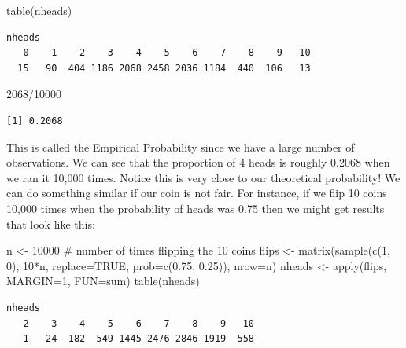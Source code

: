 \documentclass[
  letterpaper,
  DIV=11,
  numbers=noendperiod]{scrreprt}
\newenvironment{Shaded}{\begin{snugshade}}{\end{snugshade}}
\newcommand{\AttributeTok}[1]{\textcolor[rgb]{0.40,0.45,0.13}{#1}}
\newcommand{\CommentTok}[1]{\textcolor[rgb]{0.37,0.37,0.37}{#1}}
\newcommand{\ConstantTok}[1]{\textcolor[rgb]{0.56,0.35,0.01}{#1}}
\newcommand{\DecValTok}[1]{\textcolor[rgb]{0.68,0.00,0.00}{#1}}
\newcommand{\FloatTok}[1]{\textcolor[rgb]{0.68,0.00,0.00}{#1}}
\newcommand{\FunctionTok}[1]{\textcolor[rgb]{0.28,0.35,0.67}{#1}}
\newcommand{\NormalTok}[1]{\textcolor[rgb]{0.00,0.23,0.31}{#1}}
\newcommand{\OtherTok}[1]{\textcolor[rgb]{0.00,0.23,0.31}{#1}}
\newcommand{\SpecialCharTok}[1]{\textcolor[rgb]{0.37,0.37,0.37}{#1}}
\begin{document}
\begin{Shaded}
\begin{Highlighting}[]
\FunctionTok{table}\NormalTok{(nheads)}
\end{Highlighting}
\end{Shaded}

\begin{verbatim}
nheads
   0    1    2    3    4    5    6    7    8    9   10 
  15   90  404 1186 2068 2458 2036 1184  440  106   13 
\end{verbatim}

\begin{Shaded}
\begin{Highlighting}[]
\DecValTok{2068}\SpecialCharTok{/}\DecValTok{10000}
\end{Highlighting}
\end{Shaded}

\begin{verbatim}
[1] 0.2068
\end{verbatim}

This is called the Empirical Probability since we have a large number of
observations. We can see that the proportion of 4 heads is roughly
0.2068 when we ran it 10,000 times. Notice this is very close to our
theoretical probability! We can do something similar if our coin is not
fair. For instance, if we flip 10 coins 10,000 times when the
probability of heads was 0.75 then we might get results that look like
this:

\begin{Shaded}
\begin{Highlighting}[]
\NormalTok{n }\OtherTok{\textless{}{-}} \DecValTok{10000} \CommentTok{\# number of times flipping the 10 coins}
\NormalTok{flips }\OtherTok{\textless{}{-}} \FunctionTok{matrix}\NormalTok{(}\FunctionTok{sample}\NormalTok{(}\FunctionTok{c}\NormalTok{(}\DecValTok{1}\NormalTok{, }\DecValTok{0}\NormalTok{), }\DecValTok{10}\SpecialCharTok{*}\NormalTok{n, }\AttributeTok{replace=}\ConstantTok{TRUE}\NormalTok{, }\AttributeTok{prob=}\FunctionTok{c}\NormalTok{(}\FloatTok{0.75}\NormalTok{, }\FloatTok{0.25}\NormalTok{)), }\AttributeTok{nrow=}\NormalTok{n)}
\NormalTok{nheads }\OtherTok{\textless{}{-}} \FunctionTok{apply}\NormalTok{(flips, }\AttributeTok{MARGIN=}\DecValTok{1}\NormalTok{, }\AttributeTok{FUN=}\NormalTok{sum)}
\FunctionTok{table}\NormalTok{(nheads)}
\end{Highlighting}
\end{Shaded}

\begin{verbatim}
nheads
   2    3    4    5    6    7    8    9   10 
   1   24  182  549 1445 2476 2846 1919  558 
\end{verbatim}
\end{document}
